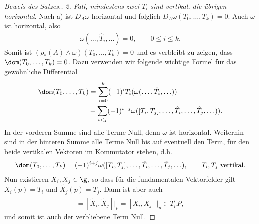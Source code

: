 \documentclass[%
	paper=a5,%
	fleqn,%
	DIV=18,%
	BCOR=0mm,
	fontsize=11pt,
	titlepage=false,%
	bibliography=totoc,
	DIV=18,%
	twoside=true,
	pdftitle=Riemannsche Geometrie,
	pdfauthor=Uwe Semmelmann,
	numbers=noendperiod]%
	{scrbook}
\begin{document}
\begin{proof}[Beweis des Satzes.]
\textit{2. Fall, mindestens zwei $T_i$ sind vertikal, die übrigen horizontal}.
Nach a) ist $D_A\omega$ horizontal und folglich
$D_A\omega(T_0,\ldots,T_k) = 0$. Auch $\omega$ ist horizontal, also
\begin{align*}
\omega(\ldots,\hat{T}_i,\ldots) = 0,\qquad 0\le i\le k.
\end{align*}
Somit ist $(\rho_*(A)\wedge\omega)(T_0,\ldots,T_k) = 0$ und es verbleibt zu
zeigen, dass $\dom(T_0,\ldots,T_k) =0$. Dazu verwenden wir
folgende wichtige Formel für das gewöhnliche Differential
\begin{align*}
\dom(T_0,\ldots,T_k) &= 
\sum_{i=0}^k (-1)^i T_i(\omega(\ldots,\hat{T}_i,\ldots))\\
&+
\sum_{i<j} (-1)^{i+j}
\omega([T_i,T_j],\ldots,\hat{T}_i,\ldots,\hat{T}_j,\ldots)).
\end{align*}
In der vorderen Summe sind alle Terme Null, denn $\omega$ ist horizontal.
Weiterhin sind in der hinteren Summe alle Terme Null bis auf eventuell den Term,
für den beide vertikalen Vektoren im Kommutator stehen, d.h.
\begin{align*}
\dom(T_0,\ldots,T_k) = (-1)^{i+j}
\omega([T_i,T_j],\ldots,\hat{T}_i,\ldots,\hat{T}_j,\ldots),\qquad
T_i,T_j\text{ vertikal}.
\end{align*}
Nun existieren $X_i,X_j\in \g$, so dass für die fundamentalen Vektorfelder gilt
$\tilde{X_i}(p) = T_i$ und $\tilde{X_j}(p) = T_j$. Dann ist aber auch
\begin{align*}
[T_i,T_j] = [\tilde{X}_i,\tilde{X}_j]\bigg|_{p} =
\widetilde{[X_i,X_j]}\bigg|_{p} \in T_p^vP,
\end{align*}
und somit ist auch der verbliebene Term Null.


\end{proof}
\end{document}
